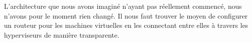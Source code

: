 \documentclass[../file.tex]{subfiles}
\begin{document}
	
L'architecture que nous avons imaginé n'ayant pas réellement commencé, nous n'avons pour le moment 
rien changé. Il nous faut trouver le moyen de configurer un routeur pour les machines virtuelles en les connectant 
entre elles à travers les hyperviseurs de manière transparente.
\end{document}
